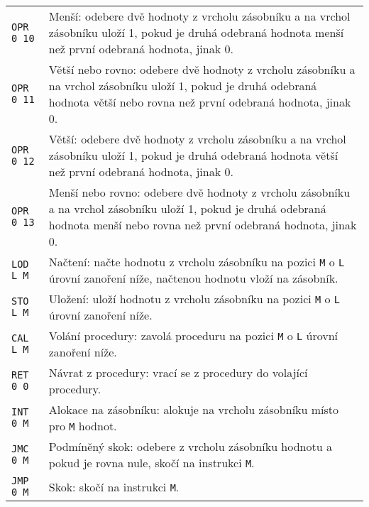 \documentclass{article}
\begin{document}
\begin{longtable}{|l| p{10cm}|}
		\rule{0pt}{4ex} \texttt{OPR 0 10} & Menší: odebere dvě hodnoty z vrcholu zásobníku a na vrchol zásobníku uloží 1, pokud je druhá odebraná hodnota menší než první odebraná hodnota, jinak 0. \\
		
		\rule{0pt}{4ex} \texttt{OPR 0 11} & Větší nebo rovno: odebere dvě hodnoty z vrcholu zásobníku a na vrchol zásobníku uloží 1, pokud je druhá odebraná hodnota větší nebo rovna než první odebraná hodnota, jinak 0. \\
		
		\rule{0pt}{4ex} \texttt{OPR 0 12} & Větší: odebere dvě hodnoty z vrcholu zásobníku a na vrchol zásobníku uloží 1, pokud je druhá odebraná hodnota větší než první odebraná hodnota, jinak 0. \\
		
		\rule{0pt}{4ex} \texttt{OPR 0 13} & Menší nebo rovno: odebere dvě hodnoty z vrcholu zásobníku a na vrchol zásobníku uloží 1, pokud je druhá odebraná hodnota menší nebo rovna než první odebraná hodnota, jinak 0. \\ \hline
		
		\rule{0pt}{3ex} \texttt{LOD L M} & Načtení: načte hodnotu z vrcholu zásobníku na pozici \texttt{M} o \texttt{L} úrovní zanoření níže, načtenou hodnotu vloží na zásobník. \\
		\hline
		
		\rule{0pt}{3ex} \texttt{STO L M} & Uložení: uloží hodnotu z vrcholu zásobníku na pozici \texttt{M} o \texttt{L} úrovní zanoření níže. \\ \hline
		
		\rule{0pt}{3ex} \texttt{CAL L M} & Volání procedury: zavolá proceduru na pozici \texttt{M} o \texttt{L} úrovní zanoření níže. \\ \hline
		
		\rule{0pt}{3ex} \texttt{RET 0 0} & Návrat z procedury: vrací se z procedury do volající procedury. \\ \hline
		
		\rule{0pt}{3ex} \texttt{INT 0 M} & Alokace na zásobníku: alokuje na vrcholu zásobníku místo pro \texttt{M} hodnot. \\ \hline
		
		\rule{0pt}{3ex} \texttt{JMC 0 M} & Podmíněný skok: odebere z vrcholu zásobníku hodnotu a pokud je rovna nule, skočí na instrukci \texttt{M}. \\ \hline
		
		\rule{0pt}{3ex} \texttt{JMP 0 M} & Skok: skočí na instrukci \texttt{M}. \\ \hline
		

\end{longtable}
\end{document}
